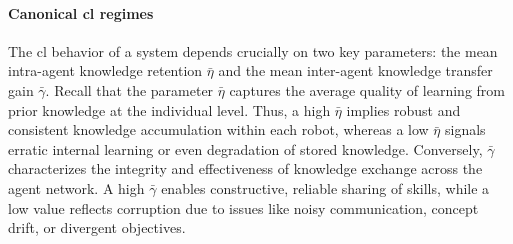 \documentclass[12pt]{article}
\begin{document}
\paragraph*{Canonical \acl{cl} regimes}
The \acl{cl} behavior of a system depends crucially on two key parameters: the mean intra-agent knowledge retention $\bar{\eta}$ and the mean inter-agent knowledge transfer gain $\bar{\gamma}$. Recall that the parameter $\bar{\eta}$ captures the average quality of learning from prior knowledge at the individual level. Thus, a high $\bar{\eta}$ implies robust and consistent knowledge accumulation within each robot, whereas a low $\bar{\eta}$ signals erratic internal learning or even degradation of stored knowledge. Conversely, $\bar{\gamma}$ characterizes the integrity and effectiveness of knowledge exchange across the agent network. A high $\bar{\gamma}$ enables constructive, reliable sharing of skills, while a low value reflects corruption due to issues like noisy communication, concept drift, or divergent objectives.

\end{document}
